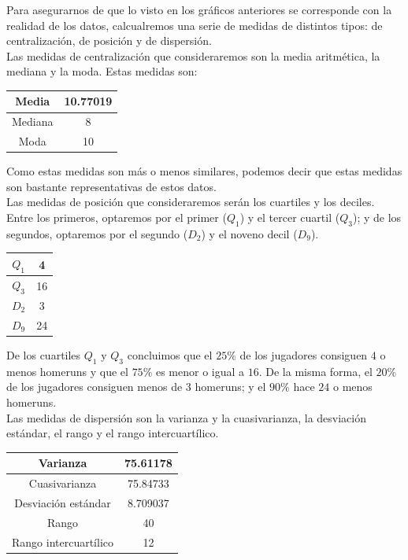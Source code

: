 \documentclass[12pt,a4paper,twoside,openright,titlepage,final]{article}
\begin{document}
Para asegurarnos de que lo visto en los gráficos anteriores se corresponde con la realidad de los datos, calcualremos una serie de medidas de distintos tipos: de centralización, de posición y de dispersión. \\

Las medidas de centralización que consideraremos son la media aritmética, la mediana y la moda. Estas medidas son:

\begin{table}[htbp]
\centering
\begin{tabular}{|c|c|}
\hline Media & 10.77019 \\ 
\hline Mediana & 8 \\ 
\hline Moda & 10  \\ 
\hline 
\end{tabular} 
\end{table}

Como estas medidas son más o menos similares, podemos decir que estas medidas son bastante representativas de estos datos.\\


Las medidas de posición que consideraremos serán los cuartiles y los deciles. Entre los primeros, optaremos por el primer ($Q_1$) y el tercer cuartil ($Q_3$); y de los segundos, optaremos por el segundo ($D_2$) y el noveno decil ($D_{9}$). \\

\begin{table}[htbp]
\centering
\begin{tabular}{|c|c|}
\hline $Q_1$ & 4 \\ 
\hline $Q_3$ & 16 \\ 
\hline $D_2$& 3  \\ 
\hline $D_9$& 24  \\ 
\hline 
\end{tabular} 
\end{table}

De los cuartiles $Q_1$ y $Q_3$ concluimos que el $25\%$ de los jugadores consiguen $4$ o menos homeruns y que el $75 \%$ es menor o igual a $16$. De la misma forma, el $20\%$ de los jugadores consiguen menos de $3$ homeruns; y el $90\%$ hace $24$ o menos homeruns.\\

Las medidas de dispersión son la varianza y la cuasivarianza, la desviación estándar, el rango y el rango intercuartílico.\\

\begin{table}[htbp]
\centering
\begin{tabular}{|c|c|}
\hline Varianza & 75.61178 \\ 
\hline Cuasivarianza & 75.84733 \\
\hline Desviación estándar & 8.709037 \\  
\hline Rango & 40  \\ 
\hline Rango intercuartílico & 12  \\ 
\hline 
\end{tabular} 
\end{table}
\end{document}
